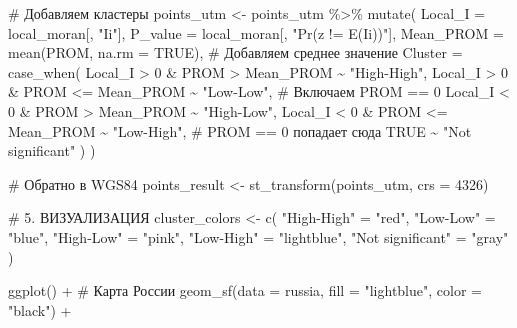 \documentclass[
  letterpaper,
  DIV=11,
  numbers=noendperiod]{scrreprt}
\newenvironment{Shaded}{\begin{snugshade}}{\end{snugshade}}
\newcommand{\AttributeTok}[1]{\textcolor[rgb]{0.40,0.45,0.13}{#1}}
\newcommand{\CommentTok}[1]{\textcolor[rgb]{0.37,0.37,0.37}{#1}}
\newcommand{\ConstantTok}[1]{\textcolor[rgb]{0.56,0.35,0.01}{#1}}
\newcommand{\DecValTok}[1]{\textcolor[rgb]{0.68,0.00,0.00}{#1}}
\newcommand{\FunctionTok}[1]{\textcolor[rgb]{0.28,0.35,0.67}{#1}}
\newcommand{\NormalTok}[1]{\textcolor[rgb]{0.00,0.23,0.31}{#1}}
\newcommand{\OtherTok}[1]{\textcolor[rgb]{0.00,0.23,0.31}{#1}}
\newcommand{\SpecialCharTok}[1]{\textcolor[rgb]{0.37,0.37,0.37}{#1}}
\newcommand{\StringTok}[1]{\textcolor[rgb]{0.13,0.47,0.30}{#1}}
\begin{document}
\begin{Shaded}
\begin{Highlighting}[]
\CommentTok{\# Добавляем кластеры}
\NormalTok{points\_utm }\OtherTok{\textless{}{-}}\NormalTok{ points\_utm }\SpecialCharTok{\%\textgreater{}\%}
  \FunctionTok{mutate}\NormalTok{(}
    \AttributeTok{Local\_I =}\NormalTok{ local\_moran[, }\StringTok{"Ii"}\NormalTok{],}
    \AttributeTok{P\_value =}\NormalTok{ local\_moran[, }\StringTok{"Pr(z != E(Ii))"}\NormalTok{],}
    \AttributeTok{Mean\_PROM =} \FunctionTok{mean}\NormalTok{(PROM, }\AttributeTok{na.rm =} \ConstantTok{TRUE}\NormalTok{),  }\CommentTok{\# Добавляем среднее значение}
    \AttributeTok{Cluster =} \FunctionTok{case\_when}\NormalTok{(}
\NormalTok{      Local\_I }\SpecialCharTok{\textgreater{}} \DecValTok{0} \SpecialCharTok{\&}\NormalTok{ PROM }\SpecialCharTok{\textgreater{}}\NormalTok{ Mean\_PROM }\SpecialCharTok{\textasciitilde{}} \StringTok{"High{-}High"}\NormalTok{,}
\NormalTok{      Local\_I }\SpecialCharTok{\textgreater{}} \DecValTok{0} \SpecialCharTok{\&}\NormalTok{ PROM }\SpecialCharTok{\textless{}=}\NormalTok{ Mean\_PROM }\SpecialCharTok{\textasciitilde{}} \StringTok{"Low{-}Low"}\NormalTok{,  }\CommentTok{\# Включаем PROM == 0}
\NormalTok{      Local\_I }\SpecialCharTok{\textless{}} \DecValTok{0} \SpecialCharTok{\&}\NormalTok{ PROM }\SpecialCharTok{\textgreater{}}\NormalTok{ Mean\_PROM }\SpecialCharTok{\textasciitilde{}} \StringTok{"High{-}Low"}\NormalTok{,}
\NormalTok{      Local\_I }\SpecialCharTok{\textless{}} \DecValTok{0} \SpecialCharTok{\&}\NormalTok{ PROM }\SpecialCharTok{\textless{}=}\NormalTok{ Mean\_PROM }\SpecialCharTok{\textasciitilde{}} \StringTok{"Low{-}High"}\NormalTok{,  }\CommentTok{\# PROM == 0 попадает сюда}
      \ConstantTok{TRUE} \SpecialCharTok{\textasciitilde{}} \StringTok{"Not significant"}
\NormalTok{    )}
\NormalTok{  )}

\CommentTok{\# Обратно в WGS84}
\NormalTok{points\_result }\OtherTok{\textless{}{-}} \FunctionTok{st\_transform}\NormalTok{(points\_utm, }\AttributeTok{crs =} \DecValTok{4326}\NormalTok{)}

\CommentTok{\# 5. ВИЗУАЛИЗАЦИЯ}
\NormalTok{cluster\_colors }\OtherTok{\textless{}{-}} \FunctionTok{c}\NormalTok{(}
  \StringTok{"High{-}High"} \OtherTok{=} \StringTok{"red"}\NormalTok{,}
  \StringTok{"Low{-}Low"} \OtherTok{=} \StringTok{"blue"}\NormalTok{,}
  \StringTok{"High{-}Low"} \OtherTok{=} \StringTok{"pink"}\NormalTok{,}
  \StringTok{"Low{-}High"} \OtherTok{=} \StringTok{"lightblue"}\NormalTok{,}
  \StringTok{"Not significant"} \OtherTok{=} \StringTok{"gray"}
\NormalTok{)}

\FunctionTok{ggplot}\NormalTok{() }\SpecialCharTok{+}
  \CommentTok{\# Карта России}
  \FunctionTok{geom\_sf}\NormalTok{(}\AttributeTok{data =}\NormalTok{ russia, }\AttributeTok{fill =} \StringTok{"lightblue"}\NormalTok{, }\AttributeTok{color =} \StringTok{"black"}\NormalTok{) }\SpecialCharTok{+}
  

\end{Highlighting}
\end{Shaded}
\end{document}
